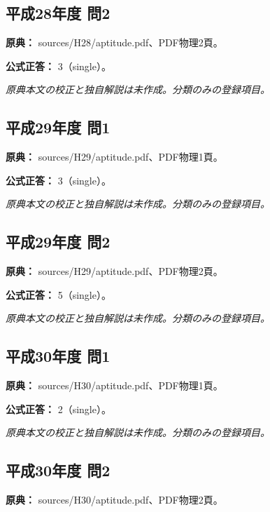 \subsection{平成28年度 問2}
\label{q:h28-reg-apt-02}

\noindent\textbf{原典：} sources/H28/aptitude.pdf、PDF物理2頁。

\textbf{公式正答：} 3（single）。

\par\textit{原典本文の校正と独自解説は未作成。分類のみの登録項目。}

\subsection{平成29年度 問1}
\label{q:h29-reg-apt-01}

\noindent\textbf{原典：} sources/H29/aptitude.pdf、PDF物理1頁。

\textbf{公式正答：} 3（single）。

\par\textit{原典本文の校正と独自解説は未作成。分類のみの登録項目。}

\subsection{平成29年度 問2}
\label{q:h29-reg-apt-02}

\noindent\textbf{原典：} sources/H29/aptitude.pdf、PDF物理2頁。

\textbf{公式正答：} 5（single）。

\par\textit{原典本文の校正と独自解説は未作成。分類のみの登録項目。}

\subsection{平成30年度 問1}
\label{q:h30-reg-apt-01}

\noindent\textbf{原典：} sources/H30/aptitude.pdf、PDF物理1頁。

\textbf{公式正答：} 2（single）。

\par\textit{原典本文の校正と独自解説は未作成。分類のみの登録項目。}

\subsection{平成30年度 問2}
\label{q:h30-reg-apt-02}

\noindent\textbf{原典：} sources/H30/aptitude.pdf、PDF物理2頁。

